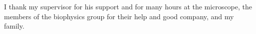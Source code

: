 I thank my supervisor for his support and for many hours at the microscope, the members of the
biophysics group for their help and good company, and my family.
